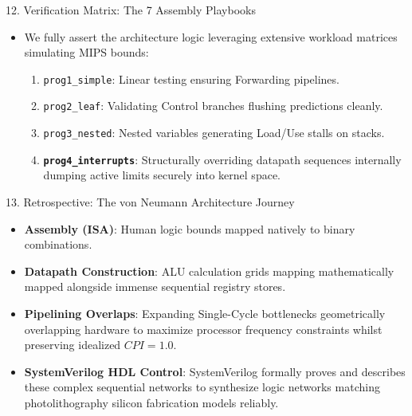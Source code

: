 \documentclass[aspectratio=169]{beamer}
\begin{document}
\begin{frame}{12. Verification Matrix: The 7 Assembly Playbooks}
\begin{itemize}
    \item We fully assert the architecture logic leveraging extensive workload matrices simulating MIPS bounds:
    \begin{enumerate}
        \item \texttt{prog1\_simple}: Linear testing ensuring Forwarding pipelines.
        \item \texttt{prog2\_leaf}: Validating Control branches flushing predictions cleanly.
        \item \texttt{prog3\_nested}: Nested variables generating Load/Use stalls on stacks.
        \item \textbf{\texttt{prog4\_interrupts}}: Structurally overriding datapath sequences internally dumping active limits securely into kernel space.
    \end{enumerate}
\end{itemize}
\end{frame}

\begin{frame}{13. Retrospective: The von Neumann Architecture Journey}
\begin{itemize}
    \item \textbf{Assembly (ISA)}: Human logic bounds mapped natively to binary combinations.
    \item \textbf{Datapath Construction}: ALU calculation grids mapping mathematically mapped alongside immense sequential registry stores.
    \item \textbf{Pipelining Overlaps}: Expanding Single-Cycle bottlenecks geometrically overlapping hardware to maximize processor frequency constraints whilst preserving idealized $CPI = 1.0$.
    \item \textbf{SystemVerilog HDL Control}: SystemVerilog formally proves and describes these complex sequential networks to synthesize logic networks matching photolithography silicon fabrication models reliably.
\end{itemize}
\end{frame}
\end{document}
